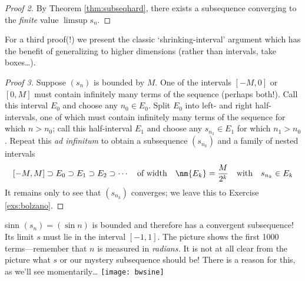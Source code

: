 \begin{proof}[Proof 2]
	By Theorem \ref{thm:subseqhard}, there exists a subsequence converging to the \emph{finite} value $\limsup s_n$.
\end{proof}

For a third proof(!) we present the classic `shrinking-interval' argument which has the benefit of generalizing to higher dimensions (rather than intervals, take boxes\ldots).

\begin{proof}[Proof 3]
	Suppose $(s_n)$ is bounded by $M$. One of the intervals $[-M,0]$ or $[0,M]$ must contain infinitely many terms of the sequence (perhaps both!). Call this interval $E_0$ and choose any $n_0\in E_0$.\smallbreak
	Split $E_0$ into left- and right half-intervals, one of which must contain infinitely many terms of the sequence for which $n>n_0$;\footnotemark{} call this half-interval $E_1$ and choose any $s_{n_1}\in E_1$ for which $n_1>n_0$.\smallbreak
	Repeat this \emph{ad infinitum} to obtain a subsequence $(s_{n_k})$ and a family of nested intervals
	\[[-M,M]\supset E_0\supset E_1\supset E_2\supset\cdots\quad\text{of width}\quad\nm{E_k}=\frac{M}{2^k}\quad\text{with}\quad s_{n_k}\in E_k\]
	It remains only to see that $(s_{n_k})$ converges; we leave this to Exercise \ref{exs:bolzano}.%
\end{proof}



\begin{example}[lower separated=false, sidebyside, sidebyside align=top seam, sidebyside gap=0pt, righthand width=0.35\linewidth]{}{sinn}
	$(s_n)=(\sin n)$ is bounded and therefore has a convergent subsequence! Its limit $s$ must lie in the interval $[-1,1]$.\smallbreak
	The picture shows the first 1000 terms---remember that $n$ is measured in \emph{radians.} It is not at all clear from the picture what $s$ or our mystery subsequence should be! There is a reason for this, as we'll see momentarily\ldots
	\tcblower
	\hfill\texttt{[image: bwsine]}
\end{example}

